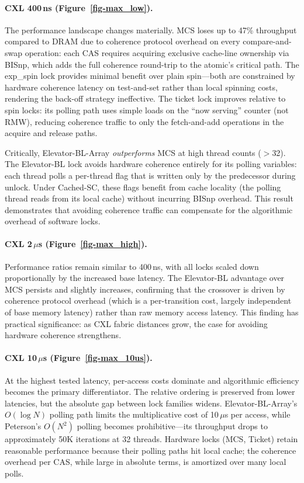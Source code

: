 \paragraph{CXL 400\,ns (Figure~\ref{fig-max_low}).}
The performance landscape changes materially.
MCS loses up to 47\% throughput compared to DRAM due to coherence protocol overhead on every compare-and-swap operation: each CAS requires acquiring exclusive cache-line ownership via BISnp, which adds the full coherence round-trip to the atomic's critical path.
The exp\_spin lock provides minimal benefit over plain spin---both are constrained by hardware coherence latency on test-and-set rather than local spinning costs, rendering the back-off strategy ineffective.
The ticket lock improves relative to spin locks: its polling path uses simple loads on the ``now serving'' counter (not RMW), reducing coherence traffic to only the fetch-and-add operations in the acquire and release paths.

Critically, Elevator-BL-Array \emph{outperforms} MCS at high thread counts ($>$32).
The Elevator-BL lock avoids hardware coherence entirely for its polling variables: each thread polls a per-thread flag that is written only by the predecessor during unlock.
Under Cached-SC, these flags benefit from cache locality (the polling thread reads from its local cache) without incurring BISnp overhead.
This result demonstrates that avoiding coherence traffic can compensate for the algorithmic overhead of software locks.

\paragraph{CXL 2\,$\mu$s (Figure~\ref{fig-max_high}).}
Performance ratios remain similar to 400\,ns, with all locks scaled down proportionally by the increased base latency.
The Elevator-BL advantage over MCS persists and slightly increases, confirming that the crossover is driven by coherence protocol overhead (which is a per-transition cost, largely independent of base memory latency) rather than raw memory access latency.
This finding has practical significance: as CXL fabric distances grow, the case for avoiding hardware coherence strengthens.

\paragraph{CXL 10\,$\mu$s (Figure~\ref{fig-max_10us}).}
At the highest tested latency, per-access costs dominate and algorithmic efficiency becomes the primary differentiator.
The relative ordering is preserved from lower latencies, but the absolute gap between lock families widens.
Elevator-BL-Array's $O(\log N)$ polling path limits the multiplicative cost of 10\,$\mu$s per access, while Peterson's $O(N^2)$ polling becomes prohibitive---its throughput drops to approximately 50K iterations at 32 threads.
Hardware locks (MCS, Ticket) retain reasonable performance because their polling paths hit local cache; the coherence overhead per CAS, while large in absolute terms, is amortized over many local polls.

